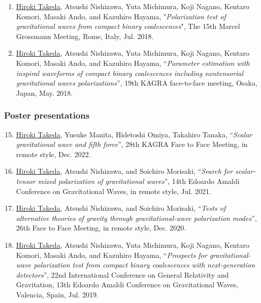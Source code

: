 \documentclass[uplatex, 12pt]{article}
\begin{document}
\begin{enumerate}
\item \uline{Hiroki Takeda}, Atsushi Nishizawa, Yuta Michimura, Koji Nagano, Kentaro Komori, Masaki Ando, and Kazuhiro Hayama, "\emph{Polarization test of gravitational waves from compact binary coalescences}", The 15th Marcel Grossmann Meeting, Rome, Italy, Jul. 2018.\\

\item \uline{Hiroki Takeda}, Atsushi Nishizawa, Yuta Michimura, Koji Nagano, Kentaro Komori, Masaki Ando, and Kazuhiro Hayama, “\emph{Parameter estimation with inspiral waveforms of compact binary coalescences including nontensorial gravitational waves polarizations}”, 19th KAGRA face-to-face meeting, Osaka, Japan, May. 2018.
\end{enumerate}

\subsubsection*{Poster presentations}

\begin{enumerate}
\setcounter{enumi}{14}
\item \uline{Hiroki Takeda}, Yusuke Manita, Hidetoshi Omiya, Takahiro Tanaka, “\emph{Scalar gravitational wave and fifth force}”, 28th KAGRA Face to Face Meeting, in remote style, Dec. 2022.\\

\item \uline{Hiroki Takeda}, Atsushi Nishizawa, and Soichiro Morisaki, “\emph{Search for scalar-tensor mixed polarization of gravitational waves}”, 14th Edoardo Amaldi Conference on Gravitational Waves, in remote style, Jul. 2021.\\

\item \uline{Hiroki Takeda}, Atsushi Nishizawa, and Soichiro Morisaki, “\emph{Tests of alternative theories of gravity through gravitational-wave polarization modes}”, 26th Face to Face Meeting, in remote style, Dec. 2020.\\

\item \uline{Hiroki Takeda}, Atsushi Nishizawa, Yuta Michimura, Koji Nagano, Kentaro Komori, Masaki Ando, and Kazuhiro Hayama, “\emph{Prospects for gravitational-wave polarization test from compact binary coalescences with next-generation detectors}”, 22nd International Conference on General Relativity and Gravitation, 13th Edoardo Amaldi Conference on Gravitational Waves, Valencia, Spain, Jul. 2019.\\

\end{enumerate}
\end{document}
